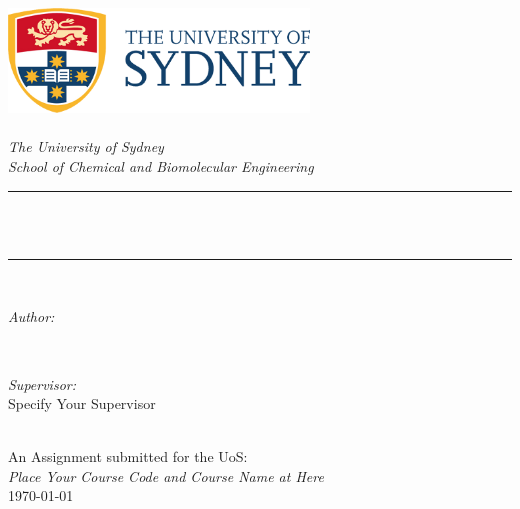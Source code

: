 \begin{titlepage}
  \newcommand{\HRule}{\rule{\linewidth}{0.5mm}}
  \includegraphics[width=8cm]{title/logo.png}\\[1cm]
  \center
  \quad\\[1.5cm]
  \textsl{\Large The University of Sydney}\\[0.5cm]
  \textsl{\large School of Chemical and Biomolecular Engineering}\\[0.5cm]
  \makeatletter
  \HRule \\[0.4cm]
  { \huge \bfseries \@title}\\[0.4cm]
  \HRule \\[1.5cm]
  \begin{minipage}{0.4\textwidth}
    \begin{flushleft} \large
      \emph{Author:}\\
      \@author
    \end{flushleft}
  \end{minipage}
  ~
  \begin{minipage}{0.4\textwidth}
    \begin{flushright} \large
      \emph{Supervisor:} \\
      \textup{Specify Your Supervisor}
    \end{flushright}
  \end{minipage}\\[3cm]
  \makeatother
  {\large An Assignment submitted for the UoS:}\\[0.5cm]
  {\large \emph{Place Your Course Code and Course Name at Here}}\\[0.5cm]
  {\large \today}\\[2cm]
  \vfill
\end{titlepage}
